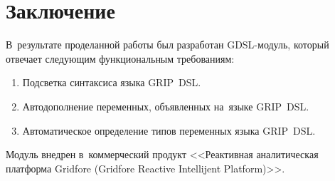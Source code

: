 \chapter*{Заключение}                       %

В~результате проделанной работы был разработан GDSL-модуль, который отвечает следующим функциональным требованиям:

\begin{enumerate} 
	\item{Подсветка синтаксиса языка GRIP~DSL.}
	\item{Автодополнение переменных, объявленных на~языке GRIP~DSL.}
	\item{Автоматическое определение типов переменных языка GRIP~DSL.}
\end{enumerate} 

Модуль внедрен в~коммерческий продукт <<Реактивная аналитическая платформа Gridfore (Gridfore Reactive Intellijent Platform)>>. 